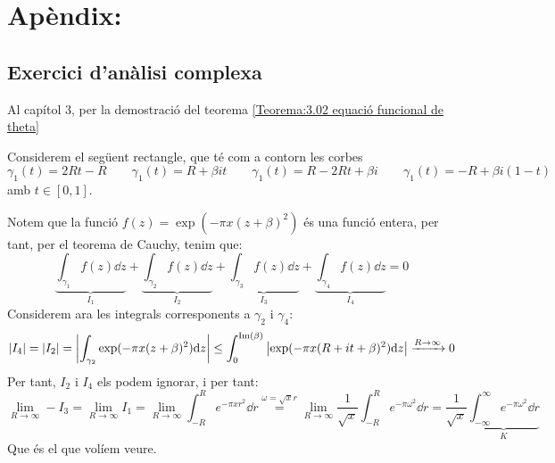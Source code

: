\chapter{Apèndix:}
\section{Exercici d'anàlisi complexa}
Al capítol 3, per la demostració del teorema \ref{Teorema:3.02 equació funcional de theta}
\begin{pf}
Considerem el següent rectangle, que té com a contorn les corbes 
\[
    \gamma_1(t)=2Rt-R\qquad
    \gamma_1(t)=R+\beta i t\qquad
    \gamma_1(t)=R-2Rt+\beta i\qquad
    \gamma_1(t)=-R+\beta i (1-t)\qquad
\]
amb $t\in[0,1]$.
\begin{center}
\end{center}
Notem que la funció $f(z)=\exp(-\pi x(z+\beta)^2)$ és una funció entera, per tant, per el teorema de Cauchy, tenim que:
\[
\underbrace{\int_{\gamma_1}f(z)\dd z}_{I_1}+\underbrace{\int_{\gamma_2}f(z)\dd z}_{I_2}+\underbrace{\int_{\gamma_3}f(z)\dd z}_{I_3}+\underbrace{\int_{\gamma_4}f(z)\dd z}_{I_4}=0
\]
Considerem ara les integrals corresponents a $\gamma_2$ i $\gamma_4$:
\[
\left|I_4\right|=
\left|I_2\right|=
\left|\int_{\gamma_2}\exp(-\pi x (z+\beta)^2)\mathrm{d} z\right|\leq
\int_{0}^{\operatorname{Im}(\beta)}
\left|
\exp(-\pi x (R+it+\beta)^2)\mathrm{d} z
\right|\xrightarrow{R\to\infty}0
\]
Per tant, $I_2$ i $I_4$ els podem ignorar, i per tant:
\[
    \lim_{R\to\infty}-I_3=
    \lim_{R\to\infty}I_1=
    \lim_{R\to\infty}\int_{-R}^{R}e^{-\pi x r^2}\dd r\overset{\omega=\sqrt{x}r}{=}
    \lim_{R\to\infty}\frac{1}{\sqrt{x}}\int_{-R}^{R}e^{-\pi \omega^2}\dd r=
    \frac{1}{\sqrt{x}}\underbrace{\int_{-\infty}^{\infty}e^{-\pi \omega^2}\dd r}_{K}
\]
Que és el que volíem veure.
\end{pf}
